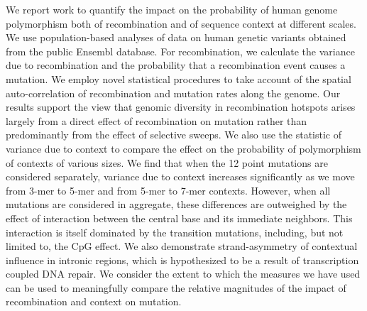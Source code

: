 We report work to quantify the impact on the probability of human genome polymorphism both of recombination and of sequence context at different scales. We use population-based analyses of data on human genetic variants obtained from the public Ensembl database. For recombination, we calculate the variance due to recombination and the probability that a recombination event causes a mutation. We employ novel statistical procedures to take account of the spatial auto-correlation of recombination and mutation rates along the genome. Our results support the view that genomic diversity in recombination hotspots arises largely from a direct effect of recombination on mutation rather than predominantly from the effect of selective sweeps. We also use the statistic of variance due to context to compare the effect on the probability of polymorphism of contexts of various sizes. We find that when the 12 point mutations are considered separately, variance due to context increases significantly as we move from 3-mer to 5-mer and from 5-mer to 7-mer contexts. However, when all mutations are considered in aggregate, these differences are outweighed by the effect of interaction between the central base and its immediate neighbors. This interaction is itself dominated by the transition mutations, including, but not limited to, the CpG effect. We also demonstrate strand-asymmetry of contextual influence in intronic regions, which is hypothesized to be a result of transcription coupled DNA repair. We consider the extent to which the measures we have used can be used to meaningfully compare the relative magnitudes of the impact of recombination and context on mutation. 